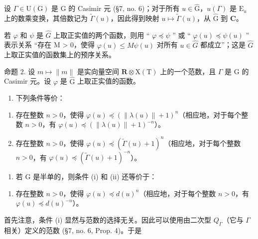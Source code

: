 设 \(\Gamma \in \mathrm{U}(\mathrm{G})\) 是 \(\mathrm{G}\) 的 Casimir 元 (§7, no. 6)；对于所有 \(u \in \hat{\mathrm{G}}\)，\(u(\Gamma)\) 是 \(\mathrm{E}_u\) 上的数乘变换，其倍数记为 \(\tilde{\Gamma}(u)\)，因此得到映射 \(u \mapsto \tilde{\Gamma}(u)\)，从 \(\hat{\mathrm{G}}\) 到 \(\mathbf{C}\)。

若 \(\varphi\) 和 \(\psi\) 是 \(\hat{G}\) 上取正实值的两个函数，则用 `` \(\varphi \preccurlyeq \psi\) '' 或 `` \(\varphi(u) \preccurlyeq \psi(u)\) '' 表示关系 ``存在 M \textgreater{} 0，使得 \(\varphi(u) \leq M\psi(u)\) 对所有 \(u \in \hat{G}\) 都成立''；这是 \(\hat{G}\) 上取正实值的函数集上的预序关系。

命题 2. 设 \(m \mapsto \|m\|\) 是实向量空间 \(\mathbf{R} \otimes \mathrm{X(T)}\) 上的一个范数，且 \(\Gamma\) 是 G 的 Casimir 元。设 \(\varphi\) 是 \(\hat{\mathrm{G}}\) 上取正实值的函数。

\begin{enumerate}
\def\labelenumi{\alph{enumi})}
\tightlist
\item
  下列条件等价：
\end{enumerate}

\begin{enumerate}
\def\labelenumi{(\roman{enumi})}
\item
  存在整数 \(n > 0\)，使得 \(\varphi(u) \preccurlyeq (\|\lambda(u)\| + 1)^n\)（相应地，对于每个整数 \(n > 0\)，有 \(\varphi(u) \preccurlyeq (\|\lambda(u)\| + 1)^{-n}\)）。
\item
  存在整数 \(n > 0\)，使得 \(\varphi(u) \preccurlyeq (\tilde{\Gamma}(u) + 1)^n\)（相应地，对于每个整数 \(n > 0\)，有 \(\varphi(u) \preccurlyeq (\tilde{\Gamma}(u) + 1)^{-n}\)）。
\end{enumerate}

\begin{enumerate}
\def\labelenumi{\alph{enumi})}
\setcounter{enumi}{1}
\tightlist
\item
  若 \(\mathrm{G}\) 是半单的，则条件 (i) 和 (ii) 还等价于：
\end{enumerate}

\begin{enumerate}
\def\labelenumi{(\roman{enumi})}
\setcounter{enumi}{2}
\tightlist
\item
  存在整数 \(n > 0\)，使得 \(\varphi(u) \preccurlyeq d(u)^n\)（相应地，对于每个整数 \(n > 0\)，有 \(\varphi(u) \preccurlyeq d(u)^{-n}\)）。
\end{enumerate}

首先注意，条件 (i) 显然与范数的选择无关。因此可以使用由二次型 \(Q_{\varGamma}\)（它与 \(\varGamma\) 相关）定义的范数 (§7, no. 6, Prop. 4)。于是

